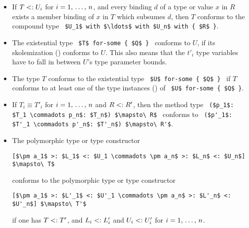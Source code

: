\begin{itemize}
  \item If $T <: U_i$ for $i = 1 ,\, \ldots ,\, n$, and every binding $d$ of a type or value $x$ in $R$ exists a member binding of $x$ in $T$ which subsumes $d$, then $T$ conforms to the compound type ~\lstinline!$U_1$ with $\ldots$ with $U_n$ with { $R$ }!. 

  \item The existential type ~\lstinline!$T$ for-some { $Q$ }!~ conforms to $U$, if its skolemization () conforms to $U$. This also means that the $t'_i$ type variables have to fall in between $U$'s type parameter bounds. 

  \item The type $T$ conforms to the existential type ~\lstinline!$U$ for-some { $Q$ }!~ if $T$ conforms to at least one of the type instances () of ~\lstinline!$U$ for-some { $Q$ }!. 

  \item If $T_i \equiv T'_i$ for $i = 1 ,\, \ldots ,\, n$ and $R <: R'$, then the method type ~\lstinline!($p_1$: $T_1 \commadots p_n$: $T_n$) $\mapsto\ R$!~ conforms to ~\lstinline!($p'_1$: $T'_1 \commadots p'_n$: $T'_n$) $\mapsto\ R'$!. 

  \item The polymorphic type or type constructor 
\begin{lstlisting}
[$\pm a_1$ >: $L_1$ <: $U_1 \commadots \pm a_n$ >: $L_n$ <: $U_n$] $\mapsto\ T$
\end{lstlisting}
conforms to the polymorphic type or type constructor 
\begin{lstlisting}
[$\pm a_1$ >: $L'_1$ <: $U'_1 \commadots \pm a_n$ >: $L'_n$ <: $U'_n$] $\mapsto\ T'$
\end{lstlisting}
if one has $T <: T'$, and $L_i <: L'_i$ and $U_i <: U'_i$ for $i = 1 ,\, \ldots ,\, n$. 


\end{itemize}
